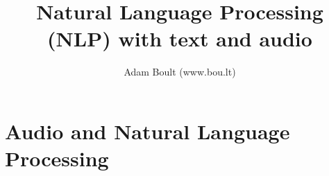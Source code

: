 \documentclass[oneside]{book}
\begin{document}
\author{Adam Boult (www.bou.lt)}
\title{Natural Language Processing (NLP) with text and audio}
\maketitle

\setcounter{tocdepth}{0}
\tableofcontents



\part{Audio and Natural Language Processing}



\end{document}
